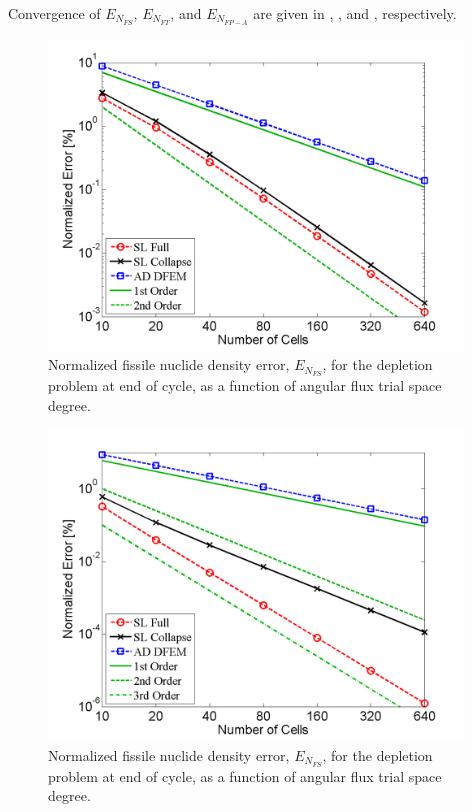 Convergence of $E_{N_{FS}}$, $E_{N_{FT}}$, and $E_{N_{FP-A}}$ are given in 
, , and , respectively.

\begin{figure}[!htp]
\centering
\includegraphics[width=11cm]{chapter5_depletion/FS_P1_norm_err.png}
\caption{Normalized fissile nuclide density error, $E_{N_{FS}}$, for the depletion problem at end of cycle, as a function of angular flux trial space degree.}
\label{fig:depletion_NFS_p1}
\end{figure}

\begin{figure}[!hbp]
\centering
\includegraphics[width=11cm]{chapter5_depletion/FS_P2_norm_err.png}
\caption{Normalized fissile nuclide density error, $E_{N_{FS}}$, for the depletion problem at end of cycle, as a function of angular flux trial space degree.}
\label{fig:depletion_NFS_p2}
\end{figure}

